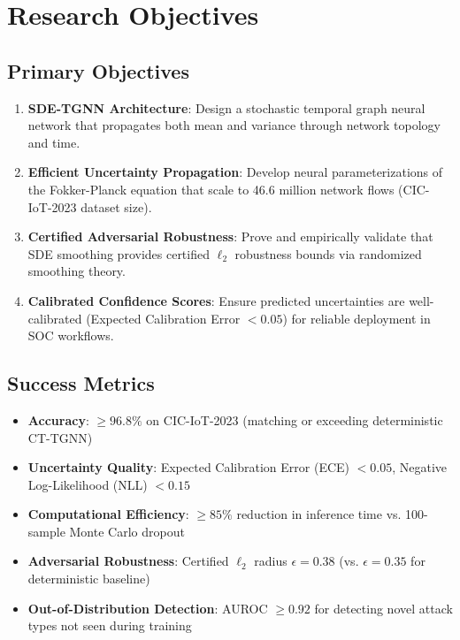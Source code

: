 \documentclass[11pt]{article}
\begin{document}
\section{Research Objectives}

\subsection{Primary Objectives}

\begin{enumerate}[label=\textbf{O\arabic*.},leftmargin=*]
    \item \textbf{SDE-TGNN Architecture}: Design a stochastic temporal graph neural network that propagates both mean and variance through network topology and time.

    \item \textbf{Efficient Uncertainty Propagation}: Develop neural parameterizations of the Fokker-Planck equation that scale to 46.6 million network flows (CIC-IoT-2023 dataset size).

    \item \textbf{Certified Adversarial Robustness}: Prove and empirically validate that SDE smoothing provides certified $\ell_2$ robustness bounds via randomized smoothing theory.

    \item \textbf{Calibrated Confidence Scores}: Ensure predicted uncertainties are well-calibrated (Expected Calibration Error $< 0.05$) for reliable deployment in SOC workflows.
\end{enumerate}

\subsection{Success Metrics}

\begin{itemize}
    \item \textbf{Accuracy}: $\geq 96.8\%$ on CIC-IoT-2023 (matching or exceeding deterministic CT-TGNN)
    \item \textbf{Uncertainty Quality}: Expected Calibration Error (ECE) $< 0.05$, Negative Log-Likelihood (NLL) $< 0.15$
    \item \textbf{Computational Efficiency}: $\geq 85\%$ reduction in inference time vs. 100-sample Monte Carlo dropout
    \item \textbf{Adversarial Robustness}: Certified $\ell_2$ radius $\epsilon = 0.38$ (vs. $\epsilon = 0.35$ for deterministic baseline)
    \item \textbf{Out-of-Distribution Detection}: AUROC $\geq 0.92$ for detecting novel attack types not seen during training
\end{itemize}
\end{document}
